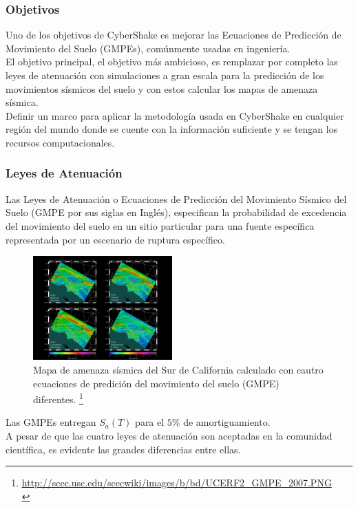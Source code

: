 %
%
\begin{frame}%
\frametitle{Objetivos}
%
\justifying
%
Uno de los objetivos de CyberShake es mejorar las Ecuaciones de Predicción de Movimiento del Suelo (GMPEs), comúnmente usadas en ingeniería.\\
%
El objetivo principal, el objetivo más ambicioso, es remplazar por completo las leyes de atenuación con simulaciones a gran escala para la predicción de los movimientos sísmicos del suelo y con estos calcular los mapas de amenaza sísmica.\\
%
Definir un marco para aplicar la metodología usada en CyberShake en cualquier región del mundo donde se cuente con la información suficiente y se tengan los recursos computacionales.
%
%
\end{frame}
%
%
\begin{frame}[allowframebreaks]\frametitle{Leyes de Atenuación}
%
\justifying
Las Leyes de Atenuación o Ecuaciones de Predicción del Movimiento Sísmico del Suelo (GMPE por sus siglas en Inglés), especifican la probabilidad de excedencia del movimiento del suelo en un sitio particular para una fuente específica representada por un escenario de ruptura específico.
%
\begin{figure}[h]
	\centering
	\includegraphics[height=4cm]{img/UCERF2_GMPE_2007.pdf}
	\caption{Mapa de amenaza sísmica del Sur de California calculado con cautro ecuaciones de predición del movimiento del suelo (GMPE) diferentes. \footnote{ \tiny\url{http://scec.usc.edu/scecwiki/images/b/bd/UCERF2_GMPE_2007.PNG}\\}}
	\vspace{-.5 cm}
\end{figure}
%
\justifying
Las GMPEs entregan $S_a \left( T \right)$ para el $5\%$ de amortiguamiento.\\
%
A pesar de que las cuatro leyes de atenuación son aceptadas en la comunidad científica, es evidente las grandes diferencias entre ellas.\\
%
%
\end{frame}
